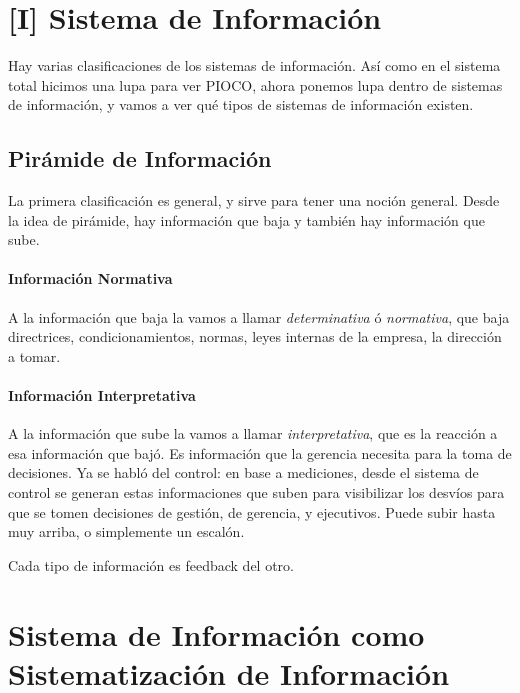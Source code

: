 \hypertarget{sistema-de-informaciuxf3n}{%
\section{{[}I{]} Sistema de Información}\label{sistema-de-informaciuxf3n}}

Hay varias clasificaciones de los sistemas de información. Así como en
el sistema total hicimos una lupa para ver PIOCO, ahora ponemos lupa
dentro de sistemas de información, y vamos a ver qué tipos de sistemas
de información existen.

\hypertarget{piruxe1mide-de-informaciuxf3n}{%
\subsection{Pirámide de
Información}\label{piruxe1mide-de-informaciuxf3n}}

La primera clasificación es general, y sirve para tener una noción
general. Desde la idea de pirámide, hay información que baja y también
hay información que sube. 
\paragraph{Información Normativa}
A la información que baja la vamos a llamar
\emph{determinativa} ó \emph{normativa}, que baja directrices,
condicionamientos, normas, leyes internas de la empresa, la dirección a
tomar. 
\paragraph{Información Interpretativa}
A la información que sube la vamos a llamar
\emph{interpretativa}, que es la reacción a esa información que bajó. Es
información que la gerencia necesita para la toma de decisiones. Ya se
habló del control: en base a mediciones, desde el sistema de control se
generan estas informaciones que suben para visibilizar los desvíos para
que se tomen decisiones de gestión, de gerencia, y ejecutivos. Puede
subir hasta muy arriba, o simplemente un escalón. 

Cada tipo de información es feedback del otro.

\hypertarget{sistema-de-informaciuxf3n-como-sistematizaciuxf3n-de-informaciuxf3n-6}{%
\section{Sistema de Información como Sistematización de Información}\label{sistema-de-informaciuxf3n-como-sistematizaciuxf3n-de-informaciuxf3n-6}}

